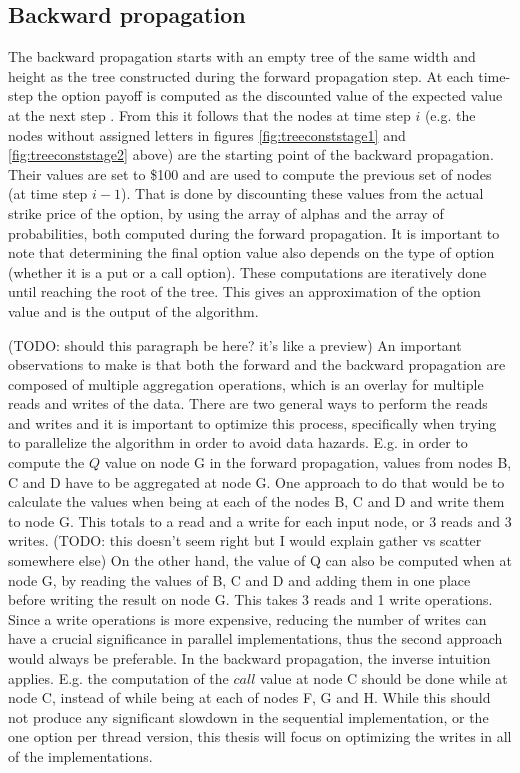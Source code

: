 \subsection{Backward propagation}
The backward propagation starts with an empty tree of the same width and height as the tree constructed during the forward propagation step. At each time-step the option payoff is computed as the discounted value of the expected value at the next step \cite[pg. 6]{uhwirt}. From this it follows that the nodes at time step $i$ (e.g. the nodes without assigned letters in figures \ref{fig:treeconststage1} and \ref{fig:treeconststage2} above) are the starting point of the backward propagation. Their values are set to \$100 and are used to compute the previous set of nodes (at time step $i-1$). That is done by discounting these values from the actual strike price of the option, by using the array of alphas and the array of probabilities, both computed during the forward propagation. It is important to note that determining the final option value also depends on the type of option (whether it is a put or a call option). These computations are iteratively done until reaching the root of the tree. This gives an approximation of the option value and is the output of the algorithm. 

(TODO: should this paragraph be here? it's like a preview)
An important observations to make is that both the forward and the backward propagation are composed of multiple aggregation operations, which is an overlay for multiple reads and writes of the data. There are two general ways to perform the reads and writes and it is important to optimize this process, specifically when trying to parallelize the algorithm in order to avoid data hazards. E.g. in order to compute the $Q$ value on node G in the forward propagation, values from nodes B, C and D have to be aggregated at node G. One approach to do that would be to calculate the values when being at each of the nodes B, C and D and write them to node G. This totals to a read and a write for each input node, or 3 reads and 3 writes. (TODO: this doesn't seem right but I would explain gather vs scatter somewhere else) On the other hand, the value of Q can also be computed when at node G, by reading the values of B, C and D and adding them in one place before writing the result on node G. This takes 3 reads and 1 write operations. Since a write operations is more expensive, reducing the number of writes can have a crucial significance in parallel implementations, thus the second approach would always be preferable. In the backward propagation, the inverse intuition applies. E.g. the computation of the $call$ value at node C should be done while at node C, instead of while being at each of nodes F, G and H. While this should not produce any significant slowdown in the sequential implementation, or the one option per thread version, this thesis will focus on optimizing the writes in all of the implementations.